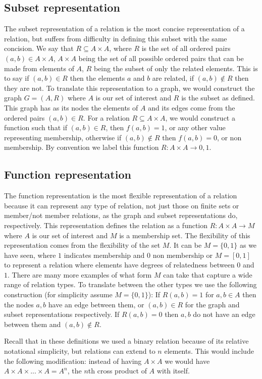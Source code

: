 \documentclass{article}
\begin{document}
\subsection{Subset representation}
The subset representation of a relation is the most concise representation of a relation, but suffers from difficulty in defining this subset with the same concision. We say that $R \subseteq A\times A$, where $R$ is the set of all ordered pairs $(a,b)\in A\times A$, $A\times A$ being the set of all possible ordered pairs that can be made from elements of $A$, $R$ being the subset of only the related elements. This is to say if $(a,b)\in R$ then the elements $a$ and $b$ are related, if $(a,b)\notin R$ then they are not. To translate this representation to a graph, we would construct the graph $G = (A,R)$ where $A$ is our set of interest and $R$ is the subset as defined. This graph has as its nodes the elements of $A$ and its edges come from the ordered pairs $(a,b)\in R$. For a relation $R\subseteq A\times A$, we would construct a function such that if $(a,b)\in R$, then $f(a,b) = 1$, or any other value representing membership, otherwise if $(a,b)\notin R$ then $f(a,b) = 0$, or non membership. By convention we label this function $R: A\times A\to {0,1}$. 

\subsection{Function representation}
The function representation is the most flexible representation of a relation because it can represent any type of relation, not just those on finite sets or member/not member relations, as the graph and subset representations do, respectively. This representation defines the relation as a function $R:A\times A\to M$ where $A$ is our set of interest and $M$ is a membership set. The flexibility of this representation comes from the flexibility of the set $M$. It can be $M=\{0,1\}$ as we have seen, where $1$ indicates membership and $0$ non membership or $M=[0,1]$ to represent a relation where elements have degrees of relatedness between $0$ and $1$. There are many more examples of what form $M$ can take that capture a wide range of relation types. To translate between the other types we use the following construction (for simplicity assume $M=\{0,1\}$): If $R(a,b) = 1$ for $a,b\in A$ then the nodes $a,b$ have an edge between them, or $(a,b)\in R$ for the graph and subset representations respectively. If $R(a,b) = 0$ then $a,b$ do not have an edge between them and $(a,b)\notin R$. %

Recall that in these definitions we used a binary relation because of its relative notational simplicity, but relations can extend to $n$ elements. This would include the following modification: instead of having $A\times A$ we would have $A\times A\times ... \times A = A^n$, the $n$th cross product of $A$ with itself. %
\end{document}
